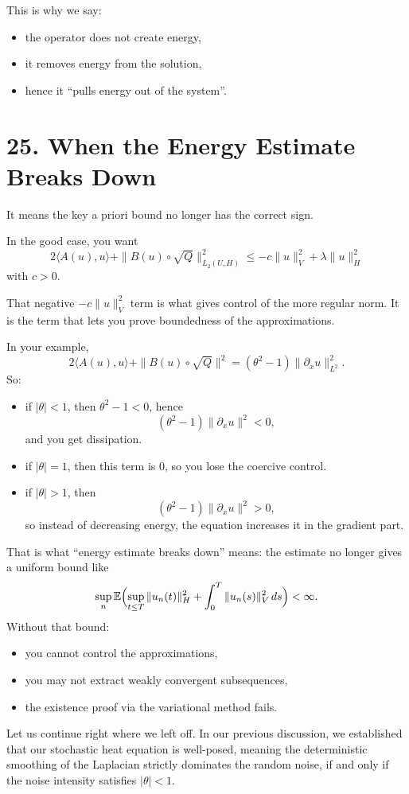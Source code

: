 \documentclass[11pt]{article}
\theoremstyle{definition}
\theoremstyle{remark}
\begin{document}
This is why we say:
\begin{itemize}
\item the operator does not create energy,
\item it removes energy from the solution,
\item hence it ``pulls energy out of the system''.
\end{itemize}


\section*{25. When the Energy Estimate Breaks Down}
It means the key a priori bound no longer has the correct sign.

In the good case, you want
\[
2\langle A(u),u\rangle + \|B(u)\circ \sqrt{Q}\|_{L_2(U,H)}^2
\le -c\|u\|_V^2 + \lambda \|u\|_H^2
\]
with $c>0$.

That negative $-c\|u\|_V^2$ term is what gives control of the more regular norm. It is the term that lets you prove boundedness of the approximations.

In your example,
\[
2\langle A(u),u\rangle + \|B(u)\circ \sqrt{Q}\|^2
=(\theta^2-1)\|\partial_x u\|_{L^2}^2.
\]
So:
\begin{itemize}
\item if $|\theta|<1$, then $\theta^2-1<0$, hence
\[
(\theta^2-1)\|\partial_x u\|^2<0,
\]
and you get dissipation.
\item if $|\theta|=1$, then this term is $0$, so you lose the coercive control.
\item if $|\theta|>1$, then
\[
(\theta^2-1)\|\partial_x u\|^2>0,
\]
so instead of decreasing energy, the equation increases it in the gradient part.
\end{itemize}

That is what ``energy estimate breaks down'' means: the estimate no longer gives a uniform bound like
\[
\sup_n \mathbb{E}\Bigl(\sup_{t\le T}\|u_n(t)\|_H^2+\int_0^T \|u_n(s)\|_V^2\,ds\Bigr)<\infty.
\]
Without that bound:
\begin{itemize}
\item you cannot control the approximations,
\item you may not extract weakly convergent subsequences,
\item the existence proof via the variational method fails.
\end{itemize}


Let us continue right where we left off. In our previous discussion, we established that our stochastic heat equation is well-posed, meaning the deterministic smoothing of the Laplacian strictly dominates the random noise, if and only if the noise intensity satisfies $|\theta|<1$.
\end{document}
